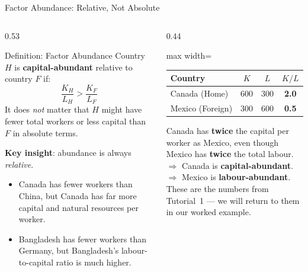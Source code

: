 \documentclass[aspectratio=169]{beamer}
\begin{document}
\begin{frame}[shrink=5]{Factor Abundance: Relative, Not Absolute}
\begin{columns}[T]
\begin{column}{0.53\textwidth}
\begin{block}{Definition: Factor Abundance}
Country $H$ is \textbf{capital-abundant} relative to
country $F$ if:
\[\frac{K_H}{L_H} > \frac{K_F}{L_F}\]
It does \emph{not} matter that $H$ might have fewer total
workers or less capital than $F$ in absolute terms.
\end{block}
\vspace{0.4em}
\textbf{Key insight}: abundance is always \emph{relative}.
\begin{itemize}\small
  \item Canada has fewer workers than China, but Canada
        has far more capital and natural resources per
        worker.
  \item Bangladesh has fewer workers than Germany, but
        Bangladesh's labour-to-capital ratio is much
        higher.
\end{itemize}
\end{column}
\begin{column}{0.44\textwidth}
\begin{adjustbox}{max width=\columnwidth}
\begin{tabular}{lccc}
\toprule
\textbf{Country} & $K$ & $L$ & $K/L$\\
\midrule
Canada (Home) & 600 & 300 & \textbf{2.0} \\
Mexico (Foreign) & 300 & 600 & \textbf{0.5} \\
\bottomrule
\end{tabular}
\end{adjustbox}
\vspace{0.5em}
\begin{varbox}
\small Canada has \textbf{twice} the capital per worker
as Mexico, even though Mexico has \textbf{twice} the
total labour.\\[0.3em]
$\Rightarrow$ Canada is \textbf{capital-abundant}.\\
$\Rightarrow$ Mexico is \textbf{labour-abundant}.\\[0.3em]
These are the numbers from Tutorial~1 --- we will
return to them in our worked example.
\end{varbox}
\end{column}
\end{columns}
\end{frame}
\end{document}
